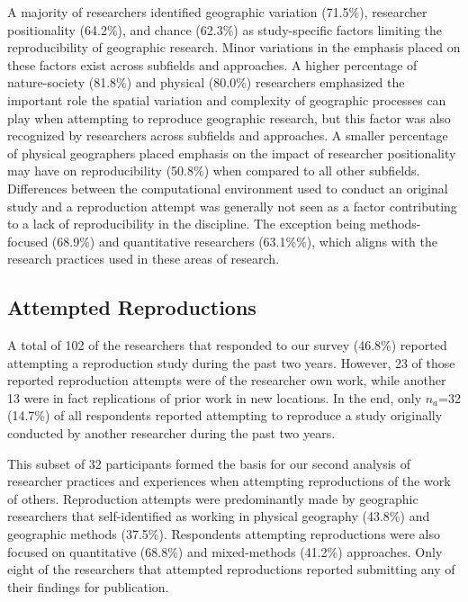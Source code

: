 \documentclass[]{interact}
\theoremstyle{plain}%
\theoremstyle{definition}
\theoremstyle{remark}
\begin{document}
A majority of researchers identified geographic variation (71.5\%), researcher positionality (64.2\%), and chance (62.3\%) as study-specific factors limiting the reproducibility of geographic research.
Minor variations in the emphasis placed on these factors exist across subfields and approaches. 
A higher percentage of nature-society (81.8\%) and physical (80.0\%) researchers emphasized the important role the spatial variation and complexity of geographic processes can play when attempting to reproduce geographic research, but this factor was also recognized by researchers across subfields and approaches. 
A smaller percentage of physical geographers placed emphasis on the impact of researcher positionality may have on reproducibility (50.8\%) when compared to all other subfields.  
Differences between the computational environment used to conduct an original study and a reproduction attempt was generally not seen as a factor contributing to a lack of reproducibility in the discipline. 
The exception being methods-focused (68.9\%) and quantitative researchers (63.1\%\%), which aligns with the research practices used in these areas of research.


\subsection*{Attempted Reproductions}
A total of 102 of the researchers that responded to our survey (46.8\%) reported attempting a reproduction study during the past two years.
However, 23 of those reported reproduction attempts were of the researcher own work, while another 13 were in fact replications of prior work in new locations.
In the end, only \textit{$n_{a}$}=32 (14.7\%) of all respondents reported attempting to reproduce a study originally conducted by another researcher during the past two years.

This subset of 32 participants formed the basis for our second analysis of researcher practices and experiences when attempting reproductions of the work of others.
Reproduction attempts were predominantly made by geographic researchers that self-identified as working in physical geography (43.8\%) and geographic methods (37.5\%).
Respondents attempting reproductions were also focused on quantitative (68.8\%) and mixed-methods (41.2\%) approaches. 
Only eight of the researchers that attempted reproductions reported submitting any of their findings for publication.
\end{document}

